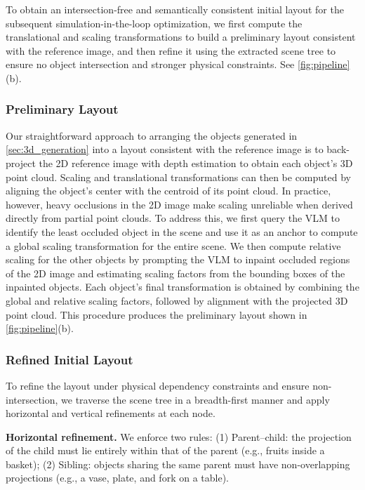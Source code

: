 To obtain an intersection-free and semantically consistent initial layout for the subsequent simulation-in-the-loop optimization, we first compute the translational and scaling transformations to build a preliminary layout consistent with the reference image, and then refine it using the extracted scene tree to ensure no object intersection and stronger physical constraints. See \autoref{fig:pipeline}(b).

\subsubsection{Preliminary Layout}


Our straightforward approach to arranging the objects generated in \autoref{sec:3d_generation} into a layout consistent with the reference image is to back-project the 2D reference image with depth estimation to obtain each object’s 3D point cloud. Scaling and translational transformations can then be computed by aligning the object’s center with the centroid of its point cloud. In practice, however, heavy occlusions in the 2D image make scaling unreliable when derived directly from partial point clouds. To address this, we first query the VLM to identify the least occluded object in the scene and use it as an anchor to compute a global scaling transformation for the entire scene. We then compute relative scaling for the other objects by prompting the VLM to inpaint occluded regions of the 2D image and estimating scaling factors from the bounding boxes of the inpainted objects. Each object’s final transformation is obtained by combining the global and relative scaling factors, followed by alignment with the projected 3D point cloud. This procedure produces the preliminary layout shown in \autoref{fig:pipeline}(b).

\subsubsection{Refined Initial Layout} \label{subsec:xz_optim}


To refine the layout under physical dependency constraints and ensure non-intersection, we traverse the scene tree in a breadth-first manner and apply horizontal and vertical refinements at each node.

\textbf{Horizontal refinement.} We enforce two rules: (1) Parent–child: the projection of the child must lie entirely within that of the parent (e.g., fruits inside a basket); (2) Sibling: objects sharing the same parent must have non-overlapping projections (e.g., a vase, plate, and fork on a table).

